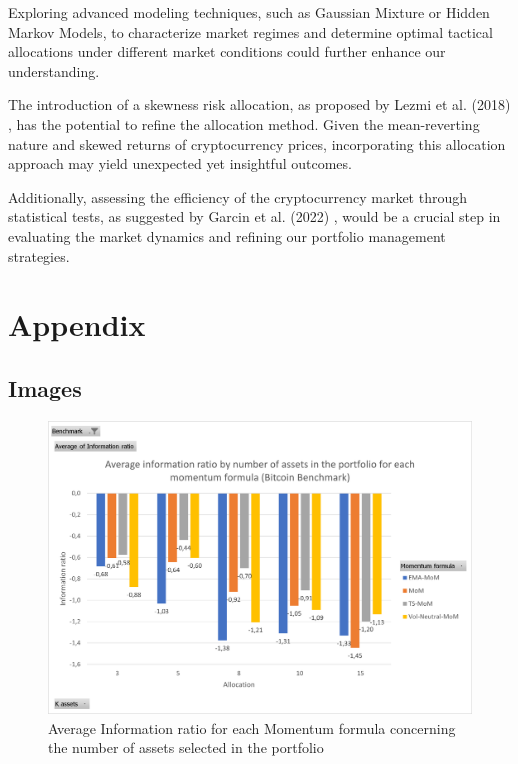 \documentclass{article}
\begin{document}
Exploring advanced modeling techniques, such as Gaussian Mixture or Hidden Markov Models, to characterize market regimes and determine optimal tactical allocations under different market conditions could further enhance our understanding.

The introduction of a skewness risk allocation, as proposed by Lezmi et al. (2018) \cite{lezmi2018portfolio}, has the potential to refine the allocation method. Given the mean-reverting nature and skewed returns of cryptocurrency prices, incorporating this allocation approach may yield unexpected yet insightful outcomes.

Additionally, assessing the efficiency of the cryptocurrency market through statistical tests, as suggested by Garcin et al. (2022) \cite{brouty2022statistical}, would be a crucial step in evaluating the market dynamics and refining our portfolio management strategies.



\section{Appendix}\label{sec:appendix}
\subsection{Images}

\begin{figure}[H] %
    \centering
    \includegraphics[width=0.75\linewidth]{relative_management/btc_bench_IR_by_k_assets_for_formula.png}
    \caption{Average Information ratio for each Momentum formula concerning the number of assets selected in the portfolio}
    \label{fig:IRForAllMoM}
\end{figure}
\end{document}
